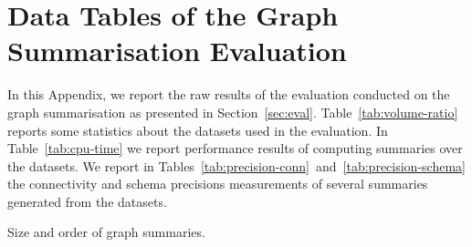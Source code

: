 \chapter{Data Tables of the Graph Summarisation Evaluation}

In this Appendix, we report the raw results of the evaluation conducted on the graph summarisation as presented in Section~\ref{sec:eval}. Table~\ref{tab:volume-ratio} reports some statistics about the datasets used in the evaluation. In Table~\ref{tab:cpu-time} we report performance results of computing summaries over the datasets. We report in Tables~\ref{tab:precision-conn}~and~\ref{tab:precision-schema} the connectivity and schema precisions measurements of several summaries generated from the datasets.

\begin{table}
	\centering
	\resizebox{\textwidth}{!}{
		
	}
	\caption{Size and order of graph summaries.}
	\label{tab:volume-ratio}
\end{table}

\begin{table}
	\centering
	\resizebox{\textwidth}{!}{
		
	}
	\caption[Computational performance of graph summaries creation]{Performance comparison. We report the CPU time in $ms$ of the \emph{edges} step in the graph summarisation computation. For each category of dataset complexity, we report the mean $\mu$ of the CPU time.%
	}
	\label{tab:cpu-time}
\end{table}





